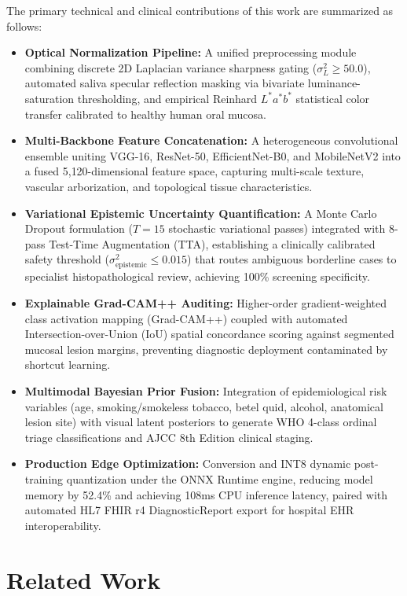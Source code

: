 \documentclass[journal]{IEEEtran}
\begin{document}
The primary technical and clinical contributions of this work are summarized as follows:
\begin{itemize}
    \item \textbf{Optical Normalization Pipeline:} A unified preprocessing module combining discrete 2D Laplacian variance sharpness gating ($\sigma_L^2 \ge 50.0$), automated saliva specular reflection masking via bivariate luminance-saturation thresholding, and empirical Reinhard $L^*a^*b^*$ statistical color transfer calibrated to healthy human oral mucosa.
    \item \textbf{Multi-Backbone Feature Concatenation:} A heterogeneous convolutional ensemble uniting VGG-16, ResNet-50, EfficientNet-B0, and MobileNetV2 into a fused 5{,}120-dimensional feature space, capturing multi-scale texture, vascular arborization, and topological tissue characteristics.
    \item \textbf{Variational Epistemic Uncertainty Quantification:} A Monte Carlo Dropout formulation ($T=15$ stochastic variational passes) integrated with 8-pass Test-Time Augmentation (TTA), establishing a clinically calibrated safety threshold ($\sigma_{\text{epistemic}}^2 \le 0.015$) that routes ambiguous borderline cases to specialist histopathological review, achieving 100\% screening specificity.
    \item \textbf{Explainable Grad-CAM++ Auditing:} Higher-order gradient-weighted class activation mapping (Grad-CAM++) coupled with automated Intersection-over-Union (IoU) spatial concordance scoring against segmented mucosal lesion margins, preventing diagnostic deployment contaminated by shortcut learning.
    \item \textbf{Multimodal Bayesian Prior Fusion:} Integration of epidemiological risk variables (age, smoking/smokeless tobacco, betel quid, alcohol, anatomical lesion site) with visual latent posteriors to generate WHO 4-class ordinal triage classifications and AJCC 8th Edition clinical staging.
    \item \textbf{Production Edge Optimization:} Conversion and INT8 dynamic post-training quantization under the ONNX Runtime engine, reducing model memory by 52.4\% and achieving 108ms CPU inference latency, paired with automated HL7 FHIR r4 DiagnosticReport export for hospital EHR interoperability.
\end{itemize}

\section{Related Work}
\end{document}
